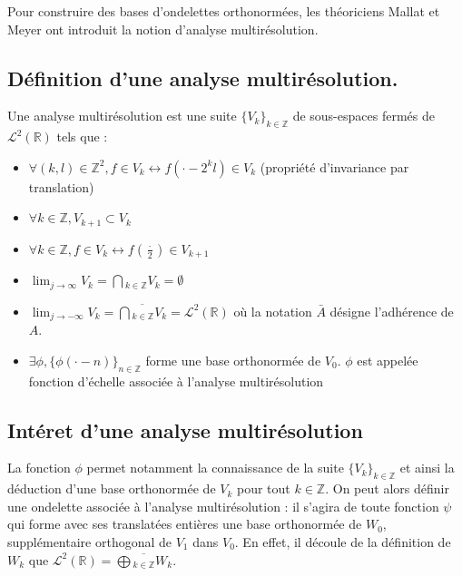 \documentclass{article}
\begin{document}
Pour construire des bases d'ondelettes orthonormées, les théoriciens Mallat et Meyer ont introduit la notion d'analyse multirésolution.

\subsection{Définition d'une analyse multirésolution.}

Une analyse multirésolution est une suite $\{V_k\}_{k\in\mathbb{Z}}$ de sous-espaces fermés de $\mathcal{L}^2(\mathbb{R})$ tels que : \\

\begin{itemize}
\item $\forall{}(k,l) \in \mathbb{Z}^2, f \in V_k \leftrightarrow f(\cdot - 2^{k}l) \in V_k $ (propriété d'invariance par translation)

\item $\forall k \in \mathbb{Z}, V_{k+1} \subset V_k$

\item $\forall k \in \mathbb{Z}, f \in V_k \leftrightarrow f(\frac{\cdot}{2}) \in V_{k+1}$

\item $\displaystyle \lim_{j \to \infty} V_k = \bigcap{}_{k\in\mathbb{Z}}V_k = \emptyset $

\item $\displaystyle \lim_{j \to -\infty} V_k = \overline{\bigcap{}_{k\in\mathbb{Z}}V_k} = \mathcal{L}^2(\mathbb{R}) $ où la notation $\bar{A}$ désigne l'adhérence de $A$.

\item $\exists\phi, \{\phi(\cdot - n)\}_{n \in \mathbb{Z}}$ forme une base orthonormée de $V_0$. $\phi$ est appelée fonction d'échelle associée à l'analyse multirésolution
\end{itemize}

\subsection{Intéret d'une analyse multirésolution}

La fonction $\phi$ permet notamment la connaissance de la suite $\{V_k\}_{k\in\mathbb{Z}}$ et ainsi la déduction d'une base orthonormée de $V_k$ pour tout $k \in \mathbb{Z}$. On peut alors définir une ondelette associée à l'analyse multirésolution : il s'agira de toute fonction $\psi$ qui forme avec ses translatées entières une base orthonormée de $W_0$, supplémentaire orthogonal de $V_1$ dans $V_0$. En effet, il découle de la définition de $W_k$ que $\displaystyle \mathcal{L}^2(\mathbb{R}) = \overline{\bigoplus{}_{k\in\mathbb{Z}}W_k}$. \\
\end{document}
